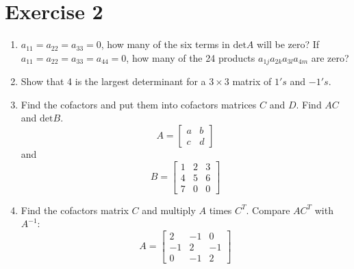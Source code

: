 \section{Exercise 2}
\begin{enumerate}[label=\arabic*.]
    \item $a_{11} = a_{22} = a_{33} =0 $, how many of the six terms in
        $\text{det} A$ will be zero? If $a_{11} = a_{22} = a_{33} = a_{44}
        = 0 $, how many of the 24 products $a_{1j}a_{2k}a_{3l}a_{4m}$ are
        zero?
    \item Show that 4 is the largest determinant for a $3 \times 3$ matrix
        of $1's$ and $-1's$.

    \item Find the cofactors and put them into cofactors matrices $C$ and
        $D$. Find $AC$ and $\text{det}B$.
        \begin{equation}
          A = 
          \begin{bmatrix}
            a & b \\
            c & d
           \end{bmatrix}
        \end{equation}
        and 
        \begin{equation}
            B = 
            \begin{bmatrix}
                1 & 2 & 3 \\
                4 & 5 & 6 \\
                7 & 0 & 0
            \end{bmatrix}
        \end{equation}

    \item Find the cofactors matrix $C$ and multiply $A$ times $C^{T}$.
        Compare $AC^{T}$ with $A^{-1}$:
        \begin{equation}
            A =
            \begin{bmatrix}
                2 & -1 & 0 \\
                -1 & 2 & -1 \\
                0 & -1 & 2
             \end{bmatrix}
        \end{equation}
\end{enumerate}
